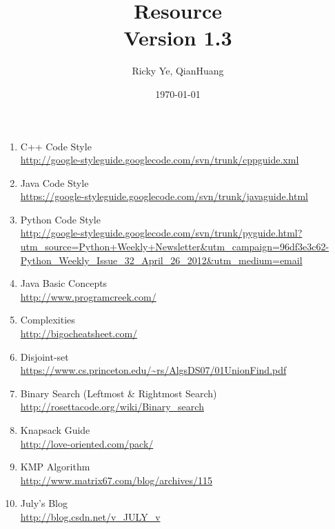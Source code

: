 \documentclass[paper=a4, fontsize=11pt]{scrartcl} %
\begin{document}
\title{Resource\\\textnormal{\small{Version 1.3}}}
\author{Ricky Ye, QianHuang}
\date{\today}
\maketitle

\begin{enumerate}[label=\upshape(\arabic*\upshape)]
  \item C++ Code Style\\ \url{http://google-styleguide.googlecode.com/svn/trunk/cppguide.xml}
  \item Java Code Style\\ \url{https://google-styleguide.googlecode.com/svn/trunk/javaguide.html}
  \item Python Code Style\\ \url{http://google-styleguide.googlecode.com/svn/trunk/pyguide.html?utm_source=Python+Weekly+Newsletter&utm_campaign=96df3e3c62-Python_Weekly_Issue_32_April_26_2012&utm_medium=email}
  \item Java Basic Concepts\\ \url{http://www.programcreek.com/}
  \item Complexities\\ \url{http://bigocheatsheet.com/}
  \item Disjoint-set\\ \url{https://www.cs.princeton.edu/~rs/AlgsDS07/01UnionFind.pdf}
  \item Binary Search (Leftmost \& Rightmost Search)\\ \url{http://rosettacode.org/wiki/Binary_search} 
  \item Knapsack Guide\\ \url{http://love-oriented.com/pack/}
  \item KMP Algorithm\\ \url{http://www.matrix67.com/blog/archives/115}
  \item July's Blog\\ \url{http://blog.csdn.net/v_JULY_v}
\end{enumerate}
\end{document}
